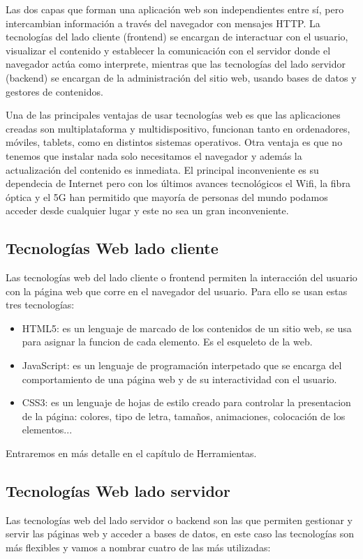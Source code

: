 Las dos capas que forman una aplicación web son independientes entre sí, pero intercambian información a través del navegador con mensajes HTTP. La tecnologías del  lado cliente (frontend) se encargan de  interactuar con el usuario, visualizar el contenido y establecer la comunicación con el servidor donde el navegador actúa como interprete,  mientras que las tecnologías del lado servidor (backend) se encargan de la administración del sitio web, usando bases de datos y gestores de contenidos.

Una de las principales ventajas de usar tecnologías web es que las aplicaciones creadas son multiplataforma y multidispositivo, funcionan tanto en ordenadores, móviles, tablets, como en distintos sistemas operativos. Otra ventaja es que no tenemos que instalar nada solo necesitamos el navegador y además la actualización del contenido es inmediata. El principal inconveniente es su dependecia de Internet pero con los últimos avances tecnológicos el Wifi, la fibra óptica y el 5G han permitido que  mayoría de personas del mundo podamos acceder desde cualquier lugar y este no sea un gran inconveniente.


\subsection{Tecnologías Web lado cliente}
Las tecnologías web del lado cliente o frontend  permiten la interacción del usuario con la página web que corre en el navegador del usuario. Para ello se usan estas tres tecnologías:

\begin{itemize}
  \item HTML5: es un lenguaje de marcado de los contenidos de un sitio web, se usa para asignar la funcion de cada elemento. Es el esqueleto de la web.
  \item JavaScript: es un lenguaje de programación interpetado que se encarga del comportamiento de una página web y de su interactividad con el usuario.
  \item CSS3: es un lenguaje de hojas de estilo creado para controlar la presentacion de la página: colores, tipo de letra, tamaños, animaciones, colocación de los elementos...
\end{itemize}

Entraremos en más detalle en el capítulo de Herramientas.


\subsection{Tecnologías Web lado servidor}
Las tecnologías web del lado servidor o backend son las que permiten gestionar y servir las páginas web y acceder a bases de datos, en este caso las tecnologías son más flexibles y vamos a nombrar cuatro de las más utilizadas:

